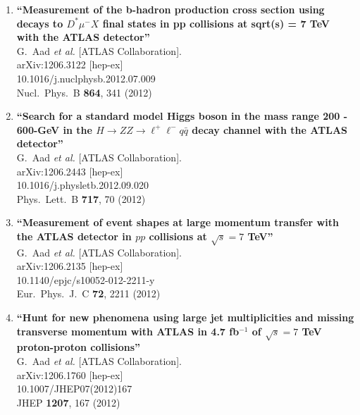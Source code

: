 \documentclass{article}
\begin{document}
\begin{enumerate}
\item%
{\bf ``Measurement of the b-hadron production cross section using decays to $D^{*}\mu^-X$ final states in pp collisions at sqrt(s) = 7 TeV with the ATLAS detector''}
  \\{}G.~Aad {\it et al.}  [ATLAS Collaboration].
  \\{}arXiv:1206.3122 [hep-ex]
    \\{}10.1016/j.nuclphysb.2012.07.009
\\{}Nucl.\ Phys.\ B {\bf 864}, 341 (2012) %


\item%
{\bf ``Search for a standard model Higgs boson in the mass range 200 - 600-GeV in the $H \to ZZ \to \ell^+ \ell^- q \bar{q}$ decay channel with the ATLAS detector''}
  \\{}G.~Aad {\it et al.}  [ATLAS Collaboration].
  \\{}arXiv:1206.2443 [hep-ex]
    \\{}10.1016/j.physletb.2012.09.020
\\{}Phys.\ Lett.\ B {\bf 717}, 70 (2012) %


\item%
{\bf ``Measurement of event shapes at large momentum transfer with the ATLAS detector in $pp$ collisions at $\sqrt{s}=7$ TeV''}
  \\{}G.~Aad {\it et al.}  [ATLAS Collaboration].
  \\{}arXiv:1206.2135 [hep-ex]
    \\{}10.1140/epjc/s10052-012-2211-y
\\{}Eur.\ Phys.\ J.\ C {\bf 72}, 2211 (2012) %


\item%
{\bf ``Hunt for new phenomena using large jet multiplicities and missing transverse momentum with ATLAS in 4.7 fb$^{-1}$ of $\sqrt{s}=7$ TeV proton-proton collisions''}
  \\{}G.~Aad {\it et al.}  [ATLAS Collaboration].
  \\{}arXiv:1206.1760 [hep-ex]
    \\{}10.1007/JHEP07(2012)167
\\{}JHEP {\bf 1207}, 167 (2012) %



\end{enumerate}
\end{document}
